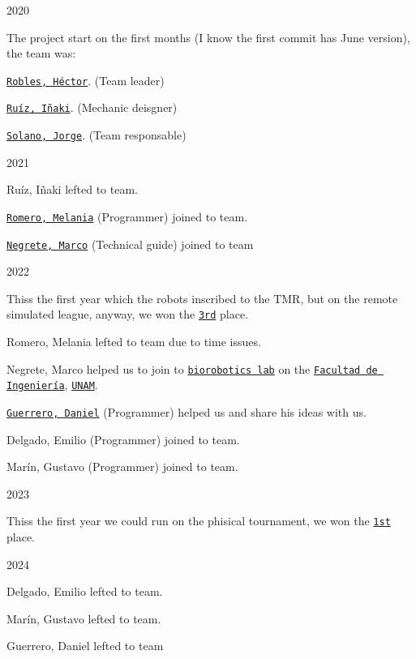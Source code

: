 \begin{DoxyItemize}
\item 2020
\begin{DoxyItemize}
\item The project start on the first months (I know the first commit has June version), the team was\+:
\item \href{https://github.com/Hector290601}{\tt Robles, Héctor}. (Team leader)
\item \href{https://github.com/Ricardo-Inaqui}{\tt Ruíz, Iñaki}. (Mechanic deisgner)
\item \href{https://github.com/jrg-sln}{\tt Solano, Jorge}. (Team responsable)
\end{DoxyItemize}
\item 2021
\begin{DoxyItemize}
\item Ruíz, Iñaki lefted to team.
\item \href{https://github.com/melaniaromero}{\tt Romero, Melania} (Programmer) joined to team.
\item \href{https://github.com/mnegretev}{\tt Negrete, Marco} (Technical guide) joined to team
\end{DoxyItemize}
\item 2022
\begin{DoxyItemize}
\item This\textquotesingle{}s the first year which the robot\textquotesingle{}s inscribed to the T\+MR, but on the remote simulated league, anyway, we won the \href{https://femexrobotica.org/tmr2022/resultados/}{\tt 3rd} place.
\item Romero, Melania lefted to team due to time issues.
\item Negrete, Marco helped us to join to \href{https://biorobotics.fi-p.unam.mx/es/}{\tt biorobotics lab} on the \href{https://www.ingenieria.unam.mx/}{\tt Facultad de Ingeniería}, \href{https://www.unam.mx/}{\tt U\+N\+AM}.
\item \href{https://github.com/danguer3}{\tt Guerrero, Daniel} (Programmer) helped us and share his ideas with us.
\item Delgado, Emilio (Programmer) joined to team.
\item Marín, Gustavo (Programmer) joined to team.
\end{DoxyItemize}
\item 2023
\begin{DoxyItemize}
\item This\textquotesingle{}s the first year we could run on the phisical tournament, we won the \href{https://femexrobotica.org/tmr2023/resultados/}{\tt 1st} place.
\end{DoxyItemize}
\item 2024
\begin{DoxyItemize}
\item Delgado, Emilio lefted to team.
\item Marín, Gustavo lefted to team.
\item Guerrero, Daniel lefted to team
\end{DoxyItemize}
\end{DoxyItemize}


